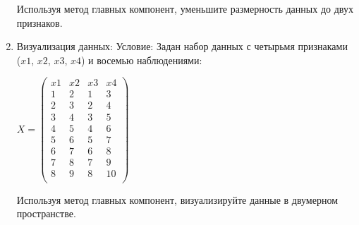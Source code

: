 \begin{enumerate}
\begin{center}
          \end{center}
          Используя метод главных компонент, уменьшите размерность данных до двух признаков.
    \item
          Визуализация данных:
          Условие: Задан набор данных с четырьмя признаками \\
          ($x1$, $x2$, $x3$, $x4$) и восемью наблюдениями:
          \begin{center}
              $X =
                  \begin{pmatrix}
                      x1 & x2 & x3 & x4 \\
                      1  & 2  & 1  & 3  \\
                      2  & 3  & 2  & 4  \\
                      3  & 4  & 3  & 5  \\
                      4  & 5  & 4  & 6  \\
                      5  & 6  & 5  & 7  \\
                      6  & 7  & 6  & 8  \\
                      7  & 8  & 7  & 9  \\
                      8  & 9  & 8  & 10 \\
                  \end{pmatrix}$\par
          \end{center}
          Используя метод главных компонент, визуализируйте данные в двумерном пространстве.
\end{enumerate}

